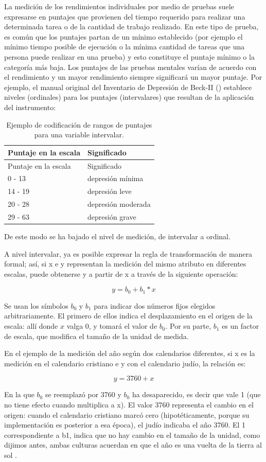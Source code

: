 \documentclass[]{book}
\begin{document}
La medición de los rendimientos individuales por medio de pruebas suele expresarse en puntajes que provienen del tiempo requerido para realizar una determinada tarea o de la cantidad de trabajo realizado. En este tipo de prueba, es común que los puntajes partan de un mínimo establecido (por ejemplo el mínimo tiempo posible de ejecución o la mínima cantidad de tareas que una persona puede realizar en una prueba) y esto constituye el puntaje mínimo o la categoría más baja. Los puntajes de las pruebas mentales varían de acuerdo con el rendimiento y un mayor rendimiento siempre significará un mayor puntaje. Por ejemplo, el manual original del Inventario de Depresión de Beck-II (\citet{Upton2013}) establece niveles (ordinales) para los puntajes (intervalares) que resultan de la aplicación del instrumento:

\begin{longtable}[]{@{}ll@{}}
\caption{\label{tab:unnamed-chunk-11}Ejemplo de codificación de rangos de puntajes para una variable intervalar.}\tabularnewline
\toprule
Puntaje en la escala & Significado\tabularnewline
\midrule
\endfirsthead
\toprule
Puntaje en la escala & Significado\tabularnewline
\midrule
\endhead
0 - 13 & depresión mínima\tabularnewline
14 - 19 & depresión leve\tabularnewline
20 - 28 & depresión moderada\tabularnewline
29 - 63 & depresión grave\tabularnewline
\bottomrule
\end{longtable}

De este modo se ha bajado el nivel de medición, de intervalar a ordinal.

A nivel intervalar, ya es posible expresar la regla de transformación de manera formal; así, si x e y representan la medición del mismo atributo en diferentes escalas, puede obtenerse y a partir de x a través de la siguiente operación:

\[y = b_0 + b_1*x\]

Se usan los símbolos \(b_0\) y \(b_1\) para indicar dos números fijos elegidos arbitrariamente. El primero de ellos indica el desplazamiento en el origen de la escala: allí donde \(x\) valga 0, y tomará el valor de \(b_0\). Por su parte, \(b_1\) es un factor de escala, que modifica el tamaño de la unidad de medida.

En el ejemplo de la medición del año según dos calendarios diferentes, si x es la medición en el calendario cristiano e y con el calendario judío, la relación es:

\[y = 3760 + x\]

En la que \(b_0\) se reemplazó por 3760 y \(b_0\) ha desaparecido, es decir que vale 1 (que no tiene efecto cuando multiplica a x). El valor 3760 representa el cambio en el origen: cuando el calendario cristiano marcó cero (hipotéticamente, porque su implementación es posterior a esa época), el judío indicaba el año 3760. El 1 correspondiente a b1, indica que no hay cambio en el tamaño de la unidad, como dijimos antes, ambas culturas acuerdan en que el año es una vuelta de la tierra al sol .
\end{document}
